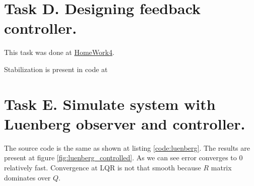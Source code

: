 \documentclass[12pt,letterpaper]{article}
\begin{document}
\newpage
\section*{Task D. Designing feedback controller.}
\label{Q:D}
    This task was done at \href{https://github.com/WinnerOK/LinearControl_assignments/tree/assignment_dev/HomeWork4}{HomeWork4}.
    
    Stabilization is present in code at 
    

\section*{Task E. Simulate system with Luenberg observer and controller.}
\label{Q:E}
    The source code is the same as shown at listing \ref{code:luenberg}. The results are present at figure \ref{fig:luenberg_controlled}. As we can see error converges to 0 relatively fast. Convergence at LQR is not that smooth because $R$ matrix dominates over $Q$.
    
\end{document}
